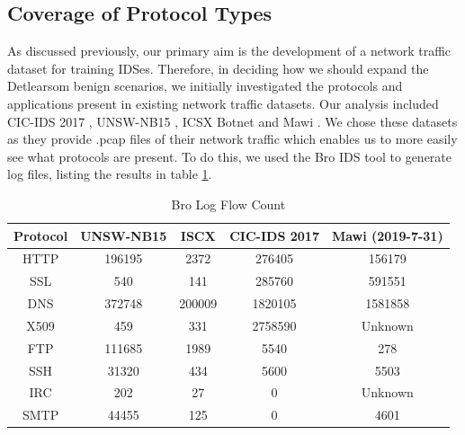 \documentclass[sigconf,anonymous]{acmart}\usepackage[]{graphicx}\usepackage[]{color}
\begin{document}
\subsection{Coverage of Protocol Types}
\label{sec:bro_logs}
As discussed previously, our primary aim is the development of a network traffic dataset for training IDSes. Therefore, in deciding how we should expand the Detlearsom benign scenarios, we initially investigated the protocols and applications present in existing network traffic datasets. Our analysis included CIC-IDS 2017 \cite{sharafaldin2018toward}, UNSW-NB15 \cite{moustafa2015unsw}, ICSX Botnet \cite{beigi2014towards} and Mawi \cite{fontugne2010mawilab}. We chose these datasets as they provide .pcap files of their network traffic which enables us to more easily see what protocols are present. To do this, we used the Bro IDS tool to generate log files, listing the results in table \ref{tab:results-bro}.

\begin{table}[ht!]
\begin{center}
\begin{small}
\begin{sc}
\begin{tabular}{ccccc}
\hline
Protocol & UNSW-NB15 & ISCX & CIC-IDS 2017 & Mawi (2019-7-31)\\
\hline
HTTP         & 196195          & 2372        & 276405   &           156179   \\
SSL          & 540          & 141         & 285760     &      591551      \\
DNS          & 372748          & 200009          & 1820105      &    1581858      \\
X509          & 459          & 331          & 2758590      &     Unknown     \\
FTP          & 111685         &  1989         & 5540        &   278    \\
SSH          & 31320          & 434       & 5600         &   5503    \\
IRC          & 202          &  27       & 0          &    Unknown  \\
SMTP          & 44455         & 125         & 0      &      4601   \\
\hline
\end{tabular}
\end{sc}
\end{small}
\vskip -2mm
\caption{Bro Log Flow Count}
\label{tab:results-bro}
\end{center}
\vskip -4mm
\end{table}
\end{document}
